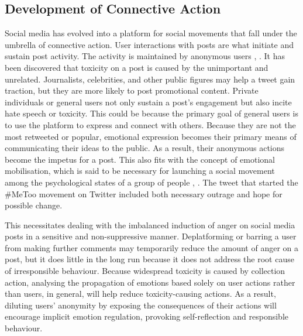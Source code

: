 \documentclass[acmtog]{acmart}
\begin{document}
\subsection{Development of Connective Action}
Social media has evolved into a platform for social movements that fall under the umbrella of connective action. User interactions with posts are what initiate and sustain post activity. The activity is maintained by anonymous users \cite{mirbabaie2021development}, \cite{saveski2021structure}. It has been discovered that toxicity on a post is caused by the unimportant and unrelated. Journalists, celebrities, and other public figures may help a tweet gain traction, but they are more likely to post promotional content. Private individuals or general users not only sustain a post's engagement but also incite hate speech or toxicity. This could be because the primary goal of general users is to use the platform to express and connect with others. Because they are not the most retweeted or popular, emotional expression becomes their primary means of communicating their ideas to the public. As a result, their anonymous actions become the impetus for a post. This also fits with the concept of emotional mobilisation, which is said to be necessary for launching a social movement among the psychological states of a group of people \cite{castells2015networks}, \cite{saveski2021structure}. The tweet that started the \#MeToo movement on Twitter included both necessary outrage and hope for possible change.

This necessitates dealing with the imbalanced induction of anger on social media posts in a sensitive and non-suppressive manner. Deplatforming or barring a user from making further comments may temporarily reduce the amount of anger on a post, but it does little in the long run because it does not address the root cause of irresponsible behaviour. Because widespread toxicity is caused by collection action, analysing the propagation of emotions based solely on user actions rather than users, in general, will help reduce toxicity-causing actions. As a result, diluting users' anonymity by exposing the consequences of their actions will encourage implicit emotion regulation, provoking self-reflection and responsible behaviour.
\end{document}
